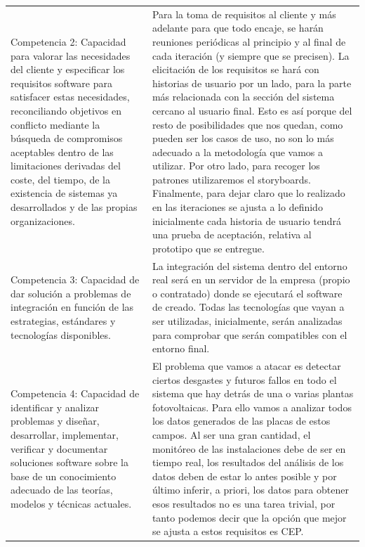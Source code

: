 \documentclass[a4paper]{article}
\begin{document}
\begin{longtable}{m{5.605cm}m{10.849cm}}
    \rowcolor{gray!30}
    {\color{black} Competencia 2: Capacidad para valorar las necesidades del cliente y especificar los requisitos software para satisfacer estas necesidades, reconciliando objetivos en conflicto mediante la b\'usqueda de compromisos aceptables dentro de las limitaciones derivadas del coste, del tiempo, de la existencia de sistemas ya desarrollados y de las propias organizaciones.} &
    {\color{black} Para la toma de requisitos al cliente y más adelante para que todo encaje, se harán reuniones periódicas al principio y al final de cada iteración (y siempre que se precisen).
    La elicitación de los requisitos se hará con historias de usuario por un lado, para la parte más relacionada con la sección del sistema cercano al usuario final. Esto es así porque del resto de posibilidades que nos quedan, como pueden ser los casos de uso, no son lo más adecuado a la metodología que vamos a utilizar. Por otro lado, para recoger los patrones utilizaremos el storyboards.\newline
    Finalmente, para dejar claro que lo realizado en las iteraciones se ajusta a lo definido inicialmente cada historia de usuario tendrá una prueba de aceptación, relativa al prototipo que se entregue.}\\
    
    {\color{black} Competencia 3: Capacidad de dar soluci\'on a problemas de integraci\'on en funci\'on de las estrategias, est\'andares y tecnolog\'ias disponibles. } &
    {\color{black} 
    La integración del sistema dentro del entorno real será en un servidor de la empresa (propio o contratado) donde se ejecutará el software de creado. Todas las tecnologías que vayan a ser utilizadas, inicialmente, serán analizadas para comprobar que serán compatibles con el entorno final.}\\
    
    \rowcolor{gray!30}
    {\color{black} Competencia 4: Capacidad de identificar y analizar problemas y dise\~nar, desarrollar, implementar, verificar y documentar soluciones software sobre la base de un conocimiento adecuado de las teor\'ias, modelos y t\'ecnicas actuales.} &
    {\color{black}El problema que vamos a atacar es detectar ciertos desgastes y futuros fallos en todo el sistema que hay detrás de una o varias plantas fotovoltaicas. Para ello vamos a analizar todos los datos generados de las placas de estos campos. Al ser una gran cantidad, el monitóreo de las instalaciones debe de ser en tiempo real, los resultados del análisis de los datos deben de estar lo antes posible y por último inferir, a priori, los datos para obtener esos resultados no es una tarea trivial, por tanto podemos decir que la opción que mejor se ajusta a estos requisitos es CEP.
    
}
\end{longtable}
\end{document}
